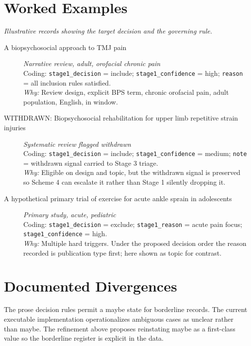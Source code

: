 \documentclass[11pt]{article}
\begin{document}
\section*{Worked Examples}
{\small\itshape Illustrative records showing the target decision and the governing rule.}\par\smallskip
\begin{description}
\item[A biopsychosocial approach to TMJ pain] {\small \textit{Narrative review, adult, orofacial chronic pain}}\\
{\small Coding: \texttt{stage1\_decision} = include; \texttt{stage1\_confidence} = high; \texttt{reason} = all inclusion rules satisfied.\\ \textit{Why:} Review design, explicit BPS term, chronic orofacial pain, adult population, English, in window.}
\item[WITHDRAWN: Biopsychosocial rehabilitation for upper limb repetitive strain injuries] {\small \textit{Systematic review flagged withdrawn}}\\
{\small Coding: \texttt{stage1\_decision} = include; \texttt{stage1\_confidence} = medium; \texttt{note} = withdrawn signal carried to Stage 3 triage.\\ \textit{Why:} Eligible on design and topic, but the withdrawn signal is preserved so Scheme 4 can escalate it rather than Stage 1 silently dropping it.}
\item[A hypothetical primary trial of exercise for acute ankle sprain in adolescents] {\small \textit{Primary study, acute, pediatric}}\\
{\small Coding: \texttt{stage1\_decision} = exclude; \texttt{stage1\_reason} = acute pain focus; \texttt{stage1\_confidence} = high.\\ \textit{Why:} Multiple hard triggers. Under the proposed decision order the reason recorded is publication type first; here shown as topic for contrast.}
\end{description}

\section*{Documented Divergences}
The prose decision rules permit a maybe state for borderline records. The current executable implementation operationalizes ambiguous cases as unclear rather than maybe. The refinement above proposes reinstating maybe as a first-class value so the borderline register is explicit in the data.
\end{document}
